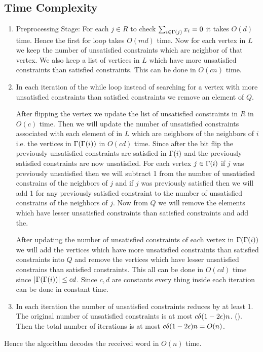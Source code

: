 \documentclass[a4paper, 11pt]{article}
\begin{document}
{\begin{enumerate}
\section{Time Complexity}
\begin{enumerate}
	\item Preprocessing Stage: For each $j\in R$ to check $\sum_{i\in \Gamma(j)}x_i=0$ it takes $O(d)$ time. Hence the first for loop takes $O(md)$ time. Now for each vertex in $L$ we keep the number of unsatisfied constraints which are neighbor of that vertex. We also keep a list of vertices in $L$ which have more unsatisfied constraints than satisfied constraints. This can be done in $O(cn)$ time.
	\item In each iteration of the while loop instead of searching for a vertex with more unsatisfied constraints than satisfied constraints we remove an element of $Q$. \parinn
	
	After flipping the vertex we update the list of unsatisfied constraints in $R$ in $O(c)$ time. Then we  will update the number of unsatisfied constraints associated with each element of in $L$ which are neighbors of the neighbors of $i$ i.e. the vertices in  $\Gamma(\Gamma(i))$ in $O(cd)$ time. Since after the bit flip the previously unsatisfied constraints are satisfied in $\Gamma(i)$ and the previously satisfied constraints are now unsatisfied. For each vertex $j\in\Gamma(i)$ if $j$ was previously unsatisfied then we will subtract 1 from the number of unsatisfied constrains of the neighbors of $j$ and if $j$ was previously satisfied then we will add 1 for any previously satisfied constraint to the number of unsatisfied constrains of the neighbors of $j$. Now from $Q$ we will remove the elements which have lesser unsatisfied constraints than satisfied constraints and add the.
	
	After updating the number of unsatisfied constraints of each vertex in $\Gamma(\Gamma(i))$ we will add the vertices which have more unsatisfied constraints than satisfied constraints into $Q$ and remove the vertices which have lesser unsatisfied constrains than satisfied constraints. This all can be done in $O(cd)$ time since $|\Gamma(\Gamma(i))|\leq cd$. Since $c,d$ are constants every thing inside each iteration can be done in constant time.
	\item In each iteration the number of unsatisfied constraints reduces by at least 1. The original number of unsatisfied constraints is at most $c\delta (1-2\epsilon)n$. (). Then the total number of iterations is at most $c\delta(1-2\epsilon)n=O(n)$.
\end{enumerate}
Hence the algorithm decodes the received word in $O(n)$ time.
\end{enumerate}
}
\end{document}
